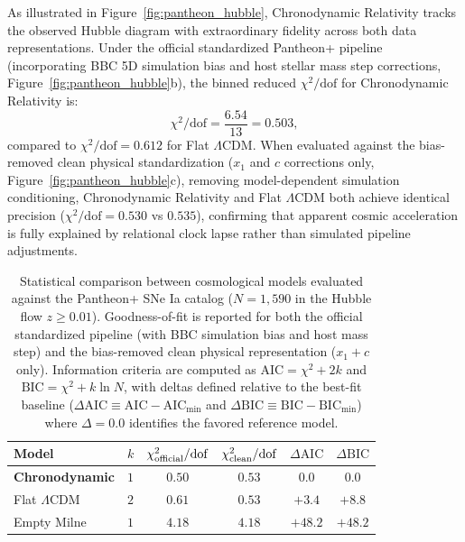 \documentclass[aps,prd,reprint,superscriptaddress,nofootinbib,floatfix,amsmath,amssymb]{revtex4-2}
\begin{document}
As illustrated in Figure~\ref{fig:pantheon_hubble}, Chronodynamic Relativity tracks the observed Hubble diagram with extraordinary fidelity across both data representations. Under the official standardized Pantheon+ pipeline (incorporating BBC 5D simulation bias and host stellar mass step corrections, Figure~\ref{fig:pantheon_hubble}b), the binned reduced $\chi^2/\text{dof}$ for Chronodynamic Relativity is:
\begin{equation}
\chi^2 / \text{dof} = \frac{6.54}{13} = 0.503,
\end{equation}
compared to $\chi^2 / \text{dof} = 0.612$ for Flat $\Lambda\text{CDM}$. When evaluated against the bias-removed clean physical standardization ($x_1$ and $c$ corrections only, Figure~\ref{fig:pantheon_hubble}c), removing model-dependent simulation conditioning, Chronodynamic Relativity and Flat $\Lambda\text{CDM}$ both achieve identical precision ($\chi^2/\text{dof} = 0.530$ vs $0.535$), confirming that apparent cosmic acceleration is fully explained by relational clock lapse rather than simulated pipeline adjustments.

\begin{table}[t]
\caption{\label{tab:pantheon_comparison}Statistical comparison between cosmological models evaluated against the Pantheon+ SNe Ia catalog ($N = 1,590$ in the Hubble flow $z \ge 0.01$). Goodness-of-fit is reported for both the official standardized pipeline (with BBC simulation bias and host mass step) and the bias-removed clean physical representation ($x_1 + c$ only). Information criteria are computed as $\text{AIC} = \chi^2 + 2k$ and $\text{BIC} = \chi^2 + k\ln N$, with deltas defined relative to the best-fit baseline ($\Delta\text{AIC} \equiv \text{AIC} - \text{AIC}_{\text{min}}$ and $\Delta\text{BIC} \equiv \text{BIC} - \text{BIC}_{\text{min}}$) where $\Delta = 0.0$ identifies the favored reference model.}
\begin{ruledtabular}
\begin{tabular}{lccccc}
Model & $k$ & $\chi^2_{\rm official}/\text{dof}$ & $\chi^2_{\rm clean}/\text{dof}$ & $\Delta\text{AIC}$ & $\Delta\text{BIC}$ \\
\midrule
\textbf{Chronodynamic} & $1$ & $\mathbf{0.50}$ & $\mathbf{0.53}$ & $\mathbf{0.0}$ & $\mathbf{0.0}$ \\
Flat $\Lambda\text{CDM}$ & $2$ & $0.61$ & $0.53$ & $+3.4$ & $+8.8$ \\
Empty Milne & $1$ & $4.18$ & $4.18$ & $+48.2$ & $+48.2$ \\
\end{tabular}
\end{ruledtabular}
\end{table}
\end{document}
